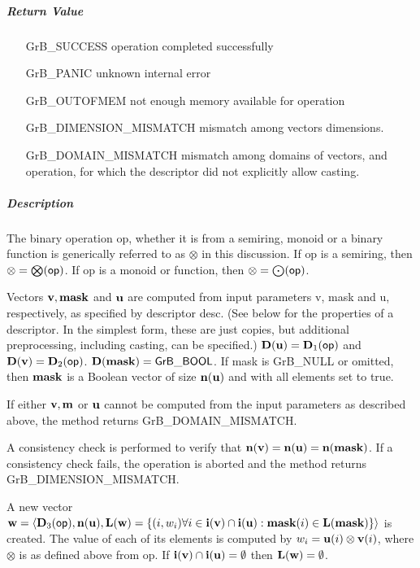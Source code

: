 \subparagraph{Return Value}

\begin{itemize}[leftmargin=2.1in]
\item[{\sf GrB\_SUCCESS}]             operation completed successfully
\item[{\sf GrB\_PANIC}]               unknown internal error
\item[{\sf GrB\_OUTOFMEM}]            not enough memory available for operation
\item[{\sf GrB\_DIMENSION\_MISMATCH}] mismatch among vectors dimensions.
\item[{\sf GrB\_DOMAIN\_MISMATCH}]    mismatch among domains of vectors, and operation, for which the descriptor did not explicitly allow casting.
\end{itemize}

\subparagraph{Description}

The binary operation {\sf op}, whether it is from a semiring, monoid or a binary function
is generically referred to as $\otimes$ in this discussion.
If {\sf op} is a semiring, then $\otimes = \bigotimes({\sf op})$. 
If {\sf op} is a monoid or function, then $\otimes = \bigodot({\sf op})$.

Vectors ${\bf v}, {\bf mask}$ and ${\bf u}$ are computed from
input parameters {\sf v}, {\sf mask} and {\sf u}, respectively, as specified
by descriptor {\sf desc}. (See below for the properties of a descriptor. In
the simplest form, these are just copies, but additional preprocessing,
including casting, can be specified.)  $\bold{D}({\bf u}) =
\bold{D}_1({\sf op})$ and $\bold{D}({\bf v}) = \bold{D}_2({\sf op})$.
$\bold{D}({\bf mask}) = {\sf GrB\_BOOL}$.  If {\sf mask} is {\sf GrB\_NULL} or omitted,
then ${\bf mask}$ is a Boolean vector of size $\bold{n}({\bf u})$
and with all elements set to {\sf true}.

If either ${\bf v}, {\bf m}$ or ${\bf u}$ cannot be computed
from the input parameters as described above, the method returns {\sf
GrB\_DOMAIN\_MISMATCH}.

A consistency check is performed to verify that $\bold{n}({\bf v})
= \bold{n}({\bf u}) = \bold{n}({\bf mask})$. If a consistency
check fails, the operation is aborted and the method returns {\sf
GrB\_DIMENSION\_MISMATCH}.

A new vector ${\bf w} = \langle \bold{D}_3({\sf op}),
\bold{n}({\bf u}), \bold{L}({\bf w}) = \{(i,w_i)  \forall i \in
{\bf i}({\bf v}) \cap {\bf i}({\bf u}) : {\bf mask}(i)
\in \bold{L}({\bf mask}) \} \rangle$ is created.  The value of each of its
elements is computed by $w_i = {\bf u}(i) \otimes {\bf v}(i)$,
where $\otimes$ is as defined above from {\sf op}.
If ${\bf i}({\bf v}) \cap {\bf i}({\bf u}) = \emptyset$
then $\bold{L}({\bf w}) = \emptyset$.

